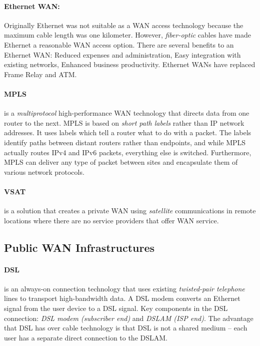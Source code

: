 \paragraph{Ethernet WAN:}Originally Ethernet was not suitable as a WAN access technology because the maximum cable length was one kilometer. However, \emph{fiber-optic} cables have made Ethernet a reasonable WAN access option. There are several benefits to an Ethernet WAN: Reduced expenses and administration, Easy integration with existing networks, Enhanced business productivity. Ethernet WANs have replaced Frame Relay and ATM.

\paragraph{MPLS} is a \emph{multiprotocol} high-performance WAN technology that directs data from one router to the next. MPLS is based on \emph{short path labels} rather than IP network addresses.  It uses labels which tell a router what to do with a packet. The labels identify paths between distant routers rather than endpoints, and while MPLS actually routes IPv4 and IPv6 packets, everything else is switched. Furthermore, MPLS can deliver any type of packet between sites and encapsulate them of various network protocols.

\paragraph{VSAT} is a solution that creates a private WAN using \emph{satellite} communications in remote locations where there are no service providers that offer WAN service.

\subsection{Public WAN Infrastructures}

\paragraph{DSL}is an always-on connection technology that uses existing \emph{twisted-pair telephone} lines to transport high-bandwidth data. A DSL modem converts an Ethernet signal from the user device to a DSL signal. Key components in the DSL connection: \emph{DSL modem (subscriber end)} and \emph{DSLAM (ISP end)}. The advantage that DSL has over cable technology is that DSL is not a shared medium -- each user has a separate direct connection to the DSLAM.

